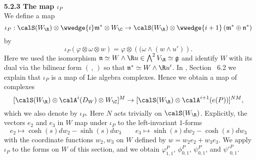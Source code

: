 \ \\[12pt] 
\textbf{5.2.3 The map $\iota_P$}\label{iotaP}
\\[10pt]
We define a map 
\[
\iota_P: \calS(W_{\R}) \otimes \wwedge{i} \mathfrak{m}^{\ast} \otimes W_{\C} \to \calS(W_{\R}) \otimes \wwedge{i+1} \left( \mathfrak{m}^{\ast} \oplus  \mathfrak{n}^{\ast} \right) 
\]
by 
\[
\iota_P(\varphi \otimes \omega \otimes w) = \varphi \otimes \left((\omega \wedge (w \wedge u')\right).
\]
Here we used the isomorphism $\mathfrak{n} \simeq W \wedge \R u \in
\bigwedge^{2} V_\R \simeq \mathfrak{g}$ and identify $W$ with its
dual via the bilinear form $(\,,\,)$ so that $\mathfrak{n}^{\ast}
\simeq W \wedge \R u'$. In \cite{FMres}, Section ~6.2 we explain
that $\iota_P$ is a map of Lie algebra complexes. Hence we obtain
a map of complexes
\[
[\calS(W_{\R}) \otimes \calA^i(D_W) \otimes W_{\C}]^M \to [\calS(W_{\R}) \otimes \calA^{i+1}(e(P))]^{NM}, 
\]
which we also denote by $\iota_P$. Here $N$ acts trivially on
$\calS(W_{\R})$. Explicitly, the vectors $e_2$ and $e_3$ in $W$ map
under $\iota_P$ to the left-invariant $1$-forms
\[
e_2 \mapsto \cosh(s)dw_2 - \sinh(s)dw_3 \qquad e_3 \mapsto \sinh(s)dw_2 - \cosh(s)dw_3
\]
with the coordinate functions $w_2,w_3$ on $W$ defined by
$w=w_2e_2+w_3e_3$. We apply $\iota_P$ to the forms on $W$ of this
section, and we obtain $\varphi_{1,1}^P$, $\phi_{0,1}^P$, $\psi_{0,1}^P$,
and ${\psi'}_{0,1}^P$.

